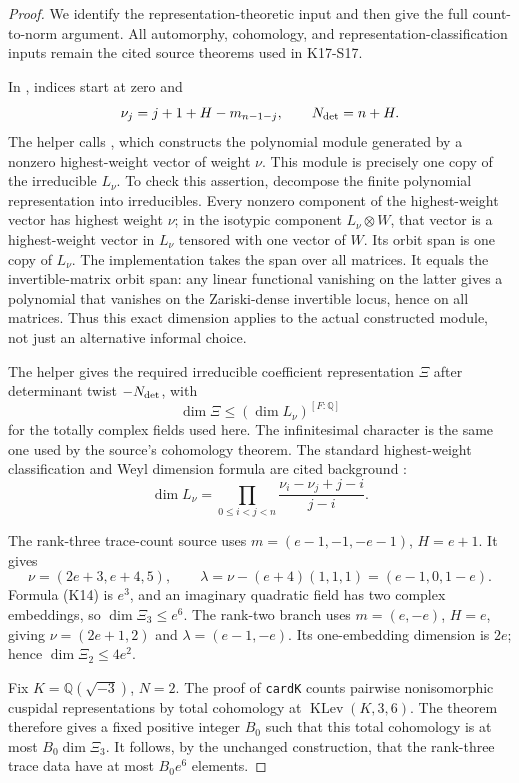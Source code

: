 \documentclass[11pt,a4paper]{article}
\theoremstyle{definition}
\begin{document}
\begin{proof}
We identify the representation-theoretic input and then give
the full count-to-norm argument. All automorphy, cohomology,
and representation-classification inputs remain the cited
source theorems used in K17-S17.

In , indices start at zero and
\[
 \nu_j=j+1+H-m_{n-1-j},\qquad N_{\rm det}=n+H.
\]
The helper  calls
, which constructs the polynomial
module generated by a nonzero highest-weight vector of
weight \(\nu\). This module is precisely one copy of
the irreducible \(L_\nu\). To check this assertion, decompose
the finite polynomial representation into irreducibles.
Every nonzero component of the highest-weight vector has
highest weight \(\nu\); in the isotypic component
\(L_\nu\otimes W\), that vector is a highest-weight vector
in \(L_\nu\) tensored with one vector of \(W\). Its orbit
span is one copy of \(L_\nu\).
The implementation takes the span over all matrices.
It equals the invertible-matrix orbit span: any linear
functional vanishing on the latter gives a polynomial that
vanishes on the Zariski-dense invertible locus, hence on all
matrices. Thus this exact dimension applies to the actual
constructed module, not just an alternative informal choice.

The helper  gives the
required irreducible coefficient representation \(\Xi\)
after determinant twist \(-N_{\rm det}\), with
\[
 \dim\Xi\le(\dim L_\nu)^{[F:\mathbb Q]}
\]
for the totally complex fields used here. The infinitesimal
character is the same one used by the source's cohomology
theorem. The standard highest-weight classification and Weyl
dimension formula are cited background
\cite[\S\S27.2--27.3 and \S28.1]{EtingofGL2024}:
\[
 \dim L_\nu=\prod_{0\le i<j<n}
       \frac{\nu_i-\nu_j+j-i}{j-i}.                  \tag{K14}
\]

The rank-three trace-count source uses
\(m=(e-1,-1,-e-1)\), \(H=e+1\).
It gives
\[
 \nu=(2e+3,e+4,5),\qquad
 \lambda=\nu-(e+4)(1,1,1)=(e-1,0,1-e).
\]
Formula (K14) is \(e^3\), and an imaginary quadratic
field has two complex embeddings, so \(\dim\Xi_3\le e^6\).
The rank-two branch uses \(m=(e,-e)\), \(H=e\), giving
\(\nu=(2e+1,2)\) and \(\lambda=(e-1,-e)\).
Its one-embedding dimension is \(2e\); hence
\(\dim\Xi_2\le4e^2\).

Fix \(K=\mathbb Q(\sqrt{-3})\), \(N=2\).
The proof of \texttt{cardK} counts pairwise nonisomorphic
cuspidal representations by total cohomology at
\(\operatorname{KLev}(K,3,6)\).
The theorem  therefore
gives a fixed positive integer \(B_0\) such that this total
cohomology is at most \(B_0\dim\Xi_3\).
It follows, by the unchanged
 construction, that
the rank-three trace data have at most \(B_0e^6\) elements.


\end{proof}
\end{document}
